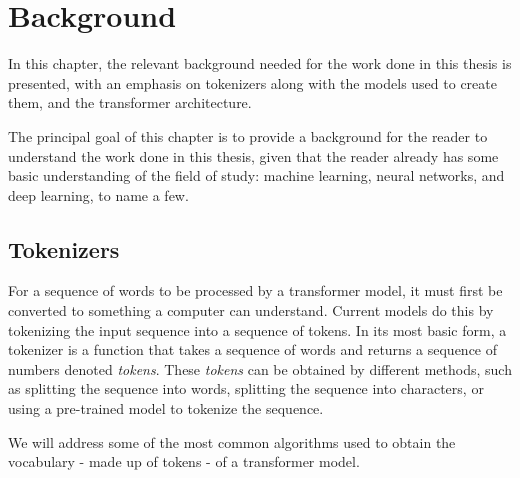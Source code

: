 
\chapter{Background}


\label{Section2}

In this chapter, the relevant background needed for the work done in this thesis is presented, with an emphasis on tokenizers along with the models used to create them, and the transformer architecture.

The principal goal of this chapter is to provide a background for the reader to understand the work done in this thesis, given that the reader already has some basic understanding of the field of study: machine learning, neural networks, and deep learning, to name a few.


\section{Tokenizers}\label{Section2.1}
For a sequence of words to be processed by a transformer model, it must first be converted to something a computer can understand.
Current models do this by tokenizing the input sequence into a sequence of tokens.
In its most basic form, a tokenizer is a function that takes a sequence of words and returns a sequence of numbers denoted \textit{tokens}.
These \textit{tokens} can be obtained by different methods, such as splitting the sequence into words, splitting the sequence into characters, or using a pre-trained model to tokenize the sequence.

We will address some of the most common algorithms used to obtain the vocabulary - made up of tokens - of a transformer model.

